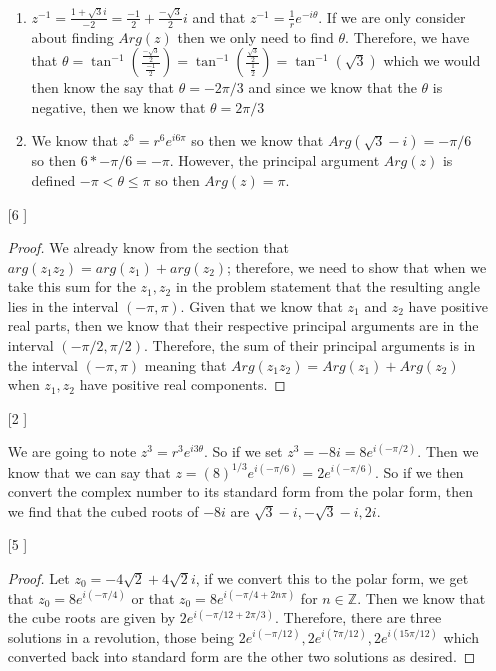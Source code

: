 \documentclass{article}
\theoremstyle{definition}
\newcommand{\Z}{\mathbb{Z}}
\begin{document}
\begin{enumerate}
    \begin{enumerate}
        \item 
        
        $z^{-1} = \frac{1+\sqrt{3}i}{-2} = \frac{-1}{2} + \frac{-\sqrt{3}}{2}i$ and that $z^{-1} = \frac{1}{r}e^{-i\theta}$. If we are only consider about finding $Arg(z)$ then we only need to find $\theta$. Therefore, we have that $\theta = \tan^{-1}(\frac{\frac{-\sqrt{3}}{2}}{\frac{-1}{2}}) = \tan^{-1}(\frac{\frac{\sqrt{3}}{2}}{\frac{1}{2}}) = \tan^{-1}(\sqrt{3})$ which we would then know the say that $\theta = -2\pi/3$ and since we know that the $\theta$ is negative, then we know that $\theta = 2\pi/3$
        
        \item
        
        We know that $z^6 = r^6e^{i6\pi}$ so then we know that $Arg(\sqrt{3} - i) = -\pi/6$ so then $6 * -\pi/6 = -\pi$. However, the principal argument $Arg (z)$ is defined $-\pi < \theta \leq \pi$ so then $Arg(z) = \pi.$
        
    \end{enumerate}
    
    \item [[\phantom{-}6]]
    
    \begin{proof}
    We already know from the section that $arg(z_1z_2) = arg(z_1) + arg(z_2)$; therefore, we need to show that when we take this sum for the $z_1, z_2$ in the problem statement that the resulting angle lies in the interval $(-\pi, \pi)$. Given that we know that $z_1$ and $z_2$ have positive real parts, then we know that their respective principal arguments are in the interval $(-\pi/2, \pi/2)$. Therefore, the sum of their principal arguments is in the interval $(-\pi, \pi)$ meaning that $Arg(z_1z_2) = Arg(z_1) + Arg(z_2)$ when $z_1, z_2$ have positive real components.
    \end{proof}
    
    \item [[\phantom{-}2]]
    
    We are going to note $z^3 = r^3e^{i3\theta}$. So if we set $z^3 = -8i = 8e^{i(-\pi/2)}$. Then we know that we can say that $z = (8)^{1/3}e^{i(-\pi/6)} = 2e^{i(-\pi/6)}$. So if we then convert the complex number to its standard form from the polar form, then we find that the cubed roots of $-8i$ are $\sqrt{3}-i, -\sqrt{3}-i, 2i.$
    
    \item [[\phantom{-}5]]
    
    \begin{proof}
    Let $z_0 = -4\sqrt{2} + 4\sqrt{2}i$, if we convert this to the polar form, we get that $z_0 = 8e^{i(-\pi/4)}$ or that $z_0 = 8e^{i(-\pi/4 + 2n\pi)}$ for $n \in \Z$. Then we know that the cube roots are given by $2e^{i(-\pi/12 + 2\pi/3)}$. Therefore, there are three solutions in a revolution, those being $2e^{i(-\pi/12)}, 2e^{i(7\pi/12)}, 2e^{i(15\pi/12)}$ which converted back into standard form are the other two solutions as desired.
    \end{proof}
    
\end{enumerate}
\end{document}
